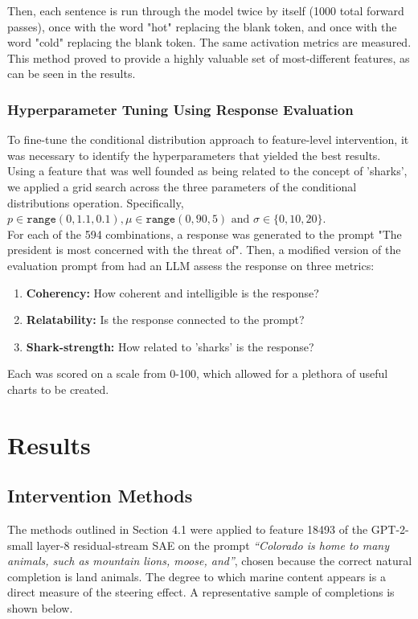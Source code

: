 \documentclass{article}
\begin{document}
Then, each sentence is run through the model twice by itself (1000 total forward passes), once with the word "hot" replacing the blank token, and once with the word "cold" replacing the blank token. The same activation metrics are measured.\\

This method proved to provide a highly valuable set of most-different features, as can be seen in the results.

\subsubsection{Hyperparameter Tuning Using Response Evaluation}

To fine-tune the conditional distribution approach to feature-level intervention, it was necessary to identify the hyperparameters that yielded the best results.\\

Using a feature that was well founded as being related to the concept of 'sharks', we applied a grid search across the three parameters of the conditional distributions operation. Specifically, $p \in \texttt{range}(0,1.1,0.1), \mu \in \texttt{range}(0,90,5) \text{ and } \sigma\in \{0,10,20\}$.\\ 

For each of the 594 combinations, a response was generated to the prompt "The president is most concerned with the threat of". Then, a modified version of the evaluation prompt from \cite{synco} had an LLM assess the response on three metrics:
\begin{enumerate}
    \item \textbf{Coherency:} How coherent and intelligible is the response?
    \item \textbf{Relatability:} Is the response connected to the prompt?
    \item \textbf{Shark-strength:} How related to 'sharks' is the response?
\end{enumerate}
Each was scored on a scale from 0-100, which allowed for a plethora of useful charts to be created.
\section{Results}
\subsection{Intervention Methods}

The methods outlined in Section 4.1 were applied to feature 18493 of the GPT-2-small layer-8 residual-stream SAE on the prompt \textit{``Colorado is home to many animals, such as mountain lions, moose, and''}, chosen because the correct natural completion is land animals. The degree to which marine content appears is a direct measure of the steering effect. A representative sample of completions is shown below.\\
\end{document}
